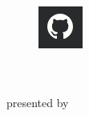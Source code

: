 \begin{titlepage}

\setcounter{page}{-1}

\begin{figure}[h]
     \begin{flushleft}

     \end{flushleft}
     \hspace{-40px}
     \noindent%
	 \begin{minipage}[t][0px][b]{0.3\textwidth}
     	\noindent\includegraphics[scale=1.3]{images/github.png}
     \end{minipage}
     \hspace{50px}
     \begin{flushright}

     \end{flushright}
\end{figure}

\vfill
\vspace{5mm}

\large
\begin{center}

	\noindent {
	 \color{uhhred}\textbf{\MakeUppercase\thesisType}
	}
	\vspace{2.0cm}\\
	\textbf{\Large \myTitle} 
	\vspace{2.0cm}\\ presented by
\vspace{0.4cm}\\
\myName

\end{center}

\vfill


\end{titlepage}
